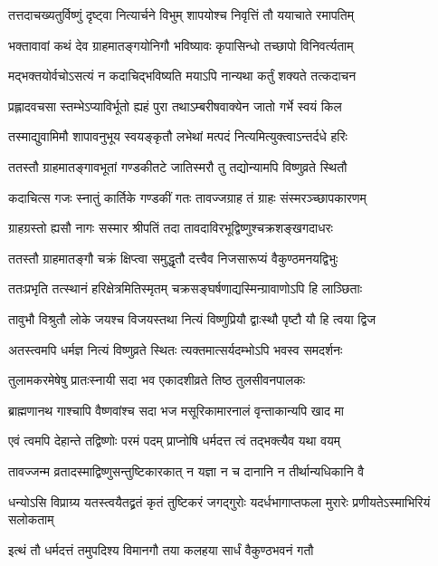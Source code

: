 \twolineshloka
{तत्तदाचख्यतुर्विष्णुं दृष्ट्वा नित्यार्चने विभुम्}
{शापयोश्च निवृत्तिं तौ ययाचाते रमापतिम्} %


\twolineshloka
{भक्तावावां कथं देव ग्राहमातङ्गयोनिगौ}
{भविष्यावः कृपासिन्धो तच्छापो विनिवर्त्यताम्} %


\twolineshloka
{मद्भक्तयोर्वचोऽसत्यं न कदाचिद्भविष्यति}
{मयाऽपि नान्यथा कर्तुं शक्यते तत्कदाचन} %

\twolineshloka
{प्रह्लादवचसा स्तम्भेऽप्याविर्भूतो ह्यहं पुरा}
{तथाऽम्बरीषवाक्येन जातो गर्भे स्वयं किल} %

\twolineshloka
{तस्माद्युवामिमौ शापावनुभूय स्वयङ्कृतौ}
{लभेथां मत्पदं नित्यमित्युक्त्वाऽन्तर्दधे हरिः} %

\twolineshloka
{ततस्तौ ग्राहमातङ्गावभूतां गण्डकीतटे}
{जातिस्मरौ तु तद्योन्यामपि विष्णुव्रते स्थितौ} %


\twolineshloka
{कदाचित्स गजः स्नातुं कार्तिके गण्डकीं गतः}
{तावज्जग्राह तं ग्राहः संस्मरञ्च्छापकारणम्} %

\twolineshloka
{ग्राहग्रस्तो ह्यसौ नागः सस्मार श्रीपतिं तदा}
{तावदाविरभूद्विष्णुश्चक्रशङ्खगदाधरः} %

\twolineshloka
{ततस्तौ ग्राहमातङ्गौ चक्रं क्षिप्त्वा समुद्धृतौ}
{दत्त्वैव निजसारूप्यं वैकुण्ठमनयद्विभुः} %

\twolineshloka
{ततःप्रभृति तत्स्थानं हरिक्षेत्रमितिस्मृतम्}
{चक्रसङ्घर्षणाद्यस्मिन्ग्रावाणोऽपि हि लाञ्छिताः} %

\twolineshloka
{तावुभौ विश्रुतौ लोके जयश्च विजयस्तथा}
{नित्यं विष्णुप्रियौ द्वाःस्थौ पृष्टौ यौ हि त्वया द्विज} %

\twolineshloka
{अतस्त्वमपि धर्मज्ञ नित्यं विष्णुव्रते स्थितः}
{त्यक्तमात्सर्यदम्भोऽपि भवस्व समदर्शनः} %

\twolineshloka
{तुलामकरमेषेषु प्रातःस्नायी सदा भव}
{एकादशीव्रते तिष्ठ तुलसीवनपालकः} %

\twolineshloka
{ब्राह्मणानथ गाश्चापि वैष्णवांश्च सदा भज}
{मसूरिकामारनालं वृन्ताकान्यपि खाद मा} %

\twolineshloka
{एवं त्वमपि देहान्ते तद्विष्णोः परमं पदम्}
{प्राप्नोषि धर्मदत्त त्वं तद्भक्त्यैव यथा वयम्} %

\twolineshloka
{तावज्जन्म व्रतादस्माद्विष्णुसन्तुष्टिकारकात्}
{न यज्ञा न च दानानि न तीर्थान्यधिकानि वै} %

\twolineshloka
{धन्योऽसि विप्राग्र्य यतस्त्वयैतद्व्रतं कृतं तुष्टिकरं जगद्गुरोः}
{यदर्धभागाप्तफला मुरारेः प्रणीयतेऽस्माभिरियं सलोकताम्} %


\twolineshloka
{इत्थं तौ धर्मदत्तं तमुपदिश्य विमानगौ}
{तया कलहया सार्धं वैकुण्ठभवनं गतौ} %

